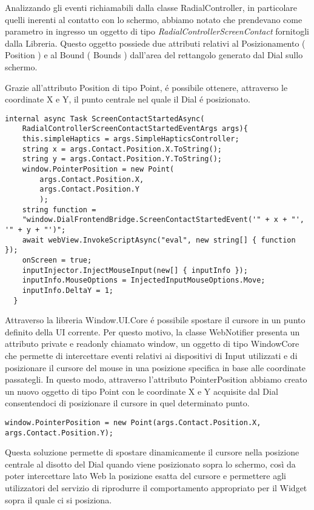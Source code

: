 Analizzando gli eventi richiamabili dalla classe RadialController, in particolare quelli inerenti al contatto con lo schermo, abbiamo notato che prendevano come parametro in ingresso un oggetto di tipo \emph{RadialControllerScreenContact} fornitogli dalla Libreria. 
Questo oggetto possiede due attributi relativi al Posizionamento ( Position ) e al Bound ( Bounds ) dall'area del rettangolo generato dal Dial sullo schermo.

Grazie all’attributo Position di tipo Point, é possibile ottenere, attraverso le coordinate X e Y, il punto centrale nel quale il Dial é posizionato.

\vspace{1.0cm}
\begin{lstlisting}[caption={Metodo ScreenContactStartedAsync},style=javaScriptCode]
 internal async Task ScreenContactStartedAsync(
 	RadialControllerScreenContactStartedEventArgs args){
    this.simpleHaptics = args.SimpleHapticsController;
    string x = args.Contact.Position.X.ToString();
    string y = args.Contact.Position.Y.ToString();
    window.PointerPosition = new Point(
    	args.Contact.Position.X, 
    	args.Contact.Position.Y
    	);
    string function = 
    "window.DialFrontendBridge.ScreenContactStartedEvent('" + x + "', '" + y + "')";
    await webView.InvokeScriptAsync("eval", new string[] { function });
    onScreen = true;
    inputInjector.InjectMouseInput(new[] { inputInfo });
    inputInfo.MouseOptions = InjectedInputMouseOptions.Move;
    inputInfo.DeltaY = 1;
  }
\end{lstlisting} 
\vspace{1.0cm}

Attraverso la libreria Window.UI.Core\cite{wuc} é possibile spostare il cursore in un punto definito della UI corrente. Per questo motivo, la classe WebNotifier presenta un attributo private e readonly chiamato window, un oggetto di tipo WindowCore che permette di intercettare eventi relativi ai dispositivi di Input utilizzati e di posizionare il cursore del mouse in una posizione specifica in base alle coordinate passategli. In questo modo, attraverso l’attributo PointerPosition abbiamo creato un nuovo oggetto di tipo Point con le coordinate X e Y acquisite dal Dial consentendoci di posizionare il cursore in quel determinato punto.
\vspace{1.0cm}
\begin{lstlisting}[caption={Spostamento cursore},style=javaScriptCode]
  window.PointerPosition = new Point(args.Contact.Position.X, args.Contact.Position.Y);
\end{lstlisting} 
\vspace{1.0cm}
Questa soluzione permette di spostare dinamicamente il cursore nella posizione centrale al disotto del Dial quando viene posizionato sopra lo schermo, così da poter intercettare lato Web la posizione esatta del cursore e permettere agli utilizzatori del servizio di riprodurre il comportamento appropriato per il Widget sopra il quale ci si posiziona.\\

